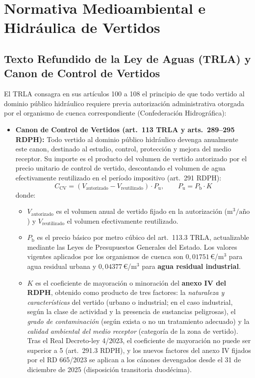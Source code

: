 \documentclass{report}
\begin{document}
\section{Normativa Medioambiental e Hidráulica de Vertidos}

\subsection{Texto Refundido de la Ley de Aguas (TRLA) y Canon de Control de Vertidos}
El TRLA consagra en sus artículos 100 a 108 el principio de que todo vertido al dominio público hidráulico requiere previa autorización administrativa otorgada por el organismo de cuenca correspondiente (Confederación Hidrográfica):
\begin{itemize}
    \item \textbf{Canon de Control de Vertidos (art.~113 TRLA y arts.~289--295 RDPH):} Todo vertido al dominio público hidráulico devenga anualmente este canon, destinado al estudio, control, protección y mejora del medio receptor. Su importe es el producto del volumen de vertido autorizado por el precio unitario de control de vertido, descontando el volumen de agua efectivamente reutilizado en el período impositivo (art.~291 RDPH):
    \begin{equation}
        C_{\text{CV}} = (V_{\text{autorizado}} - V_{\text{reutilizado}}) \cdot P_{\text{u}}, \qquad P_{\text{u}} = P_{\text{b}} \cdot K
        \label{eq:canon_vertido}
    \end{equation}
    donde:
    \begin{itemize}
        \item $V_{\text{autorizado}}$ es el volumen anual de vertido fijado en la autorización ($\text{m}^3/\text{año}$) y $V_{\text{reutilizado}}$ el volumen efectivamente reutilizado.
        \item $P_{\text{b}}$ es el precio básico por metro cúbico del art.~113.3 TRLA, actualizable mediante las Leyes de Presupuestos Generales del Estado. Los valores vigentes aplicados por los organismos de cuenca son $0{,}01751$\,€/m$^3$ para agua residual urbana y $0{,}04377$\,€/m$^3$ para \textbf{agua residual industrial}.
        \item $K$ es el coeficiente de mayoración o minoración del \textbf{anexo IV del RDPH}, obtenido como producto de tres factores: la \textit{naturaleza y características} del vertido (urbano o industrial; en el caso industrial, según la clase de actividad y la presencia de sustancias peligrosas), el \textit{grado de contaminación} (según exista o no un tratamiento adecuado) y la \textit{calidad ambiental del medio receptor} (categoría de la zona de vertido). Tras el Real Decreto-ley 4/2023, el coeficiente de mayoración no puede ser superior a 5 (art.~291.3 RDPH), y los nuevos factores del anexo IV fijados por el RD 665/2023 se aplican a los cánones devengados desde el 31 de diciembre de 2025 (disposición transitoria duodécima).
    \end{itemize}


\end{itemize}
\end{document}
